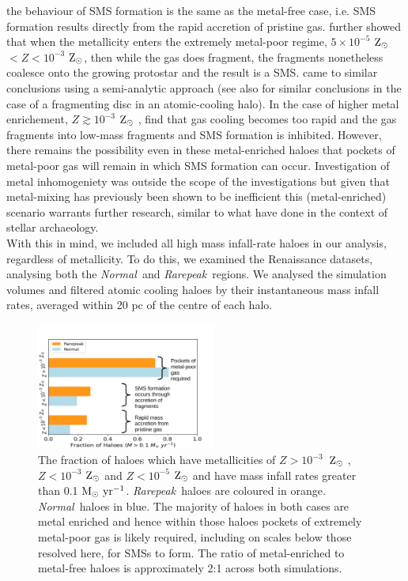 \documentclass[graphics, twocolumn, usenatbib]{mn2e}
\newcommand{\msolaryrc} {$\rm{M_{\odot}~yr^{-1}}$}
\newcommand{\zsolar} {$\rm{Z_{\odot}}~$}
\newcommand{\zsolarc} {$\rm{Z_{\odot}}$}
\newcommand{\rarepeak} {\textit{Rarepeak~}}
\newcommand{\normal} {\textit{Normal~}}
\begin{document}
the behaviour of SMS formation is the same as the metal-free case, i.e. SMS formation results
directly from the rapid accretion of pristine gas. 
\cite{Chon_2020} further showed that when the metallicity enters the
extremely metal-poor regime, $5 \times 10^{-5}$ \zsolar $ < Z < 10^{-3}$ \zsolarc, then while
the gas does fragment, the fragments nonetheless coalesce onto the growing protostar and the
result is a SMS. 
\cite{Tagawa_2020} came to similar conclusions
using a semi-analytic approach (see also \citealt{Inayoshi_2014b} for similar conclusions in the case of a fragmenting disc in an atomic-cooling halo).
In the case of higher metal enrichement,  $Z \gtrsim 10^{-3}$ \zsolar,
\citet{Chon_2020} find that gas cooling becomes too rapid and the gas fragments into low-mass fragments
and SMS formation is inhibited. However, there remains the possibility even in these
metal-enriched haloes that pockets of metal-poor gas will remain in which SMS formation can occur.
Investigation of metal inhomogeniety was outside the scope of the \cite{Chon_2020} investigations
but given that metal-mixing has previously been shown to be inefficient
\citep[e.g.][]{Smith_2015} this (metal-enriched) scenario warrants further research, similar to 
what \cite{Tarumi_2020} have done in the context of stellar archaeology. \\
\indent With this in mind, we included all high mass infall-rate haloes in our analysis, regardless of
metallicity. To do this, we examined the Renaissance datasets, analysing
both the \normal and \rarepeak regions. We analysed the simulation volumes and filtered atomic
cooling haloes by their instantaneous mass infall rates, averaged within 20 pc of the centre of each halo.  \\
\begin{figure}
   \centering 
\includegraphics[width=0.525\textwidth]{FIGURES/FinalPlot-crop.pdf}
\caption{The fraction of haloes which have metallicities of $Z > 10^{-3}$~\zsolar,
  $Z < 10^{-3}$ \zsolar and $ Z < 10^{-5}$ \zsolar and have mass infall rates greater than
  0.1 \msolaryrc. \rarepeak haloes are coloured in orange. \normal haloes in blue. 
  The majority of haloes in both cases are metal enriched and hence within
  those haloes pockets of extremely metal-poor gas 
  is likely required, including on scales below those resolved here, for SMSs to form. The
  ratio of metal-enriched to metal-free haloes is approximately 2:1 across both simulations.} \label{Fig:Fractions}
\end{figure}
\end{document}
